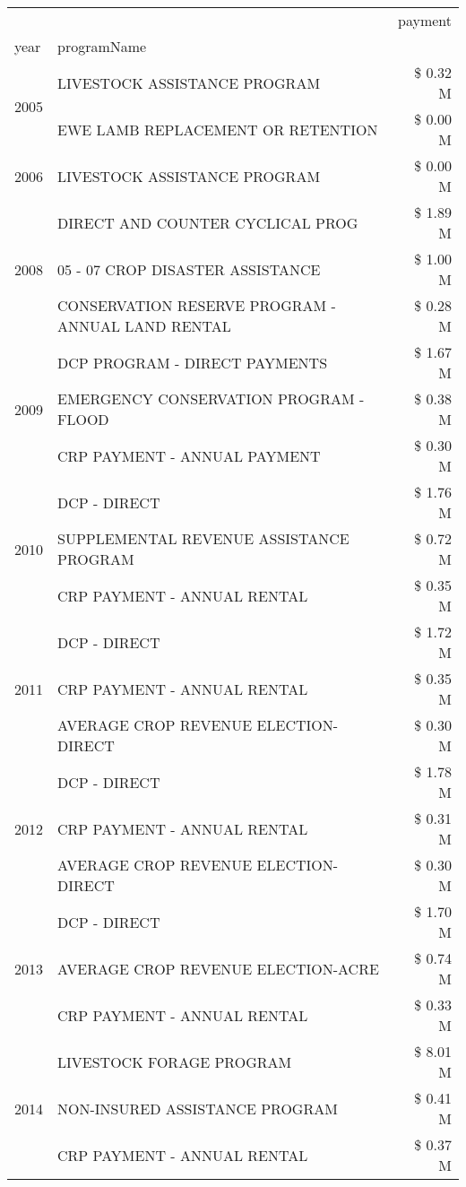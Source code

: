 \begin{tabular}{llr}
\toprule
 &  & payment \\
year & programName &  \\
\midrule
\multirow[t]{2}{*}{2005} & LIVESTOCK ASSISTANCE PROGRAM & \$ 0.32 M \\
 & EWE LAMB REPLACEMENT OR RETENTION & \$ 0.00 M \\
\cline{1-3}
2006 & LIVESTOCK ASSISTANCE PROGRAM & \$ 0.00 M \\
\cline{1-3}
\multirow[t]{3}{*}{2008} & DIRECT AND COUNTER CYCLICAL PROG & \$ 1.89 M \\
 & 05 - 07 CROP DISASTER ASSISTANCE & \$ 1.00 M \\
 & CONSERVATION RESERVE PROGRAM - ANNUAL LAND RENTAL & \$ 0.28 M \\
\cline{1-3}
\multirow[t]{3}{*}{2009} & DCP PROGRAM - DIRECT PAYMENTS & \$ 1.67 M \\
 & EMERGENCY CONSERVATION PROGRAM - FLOOD & \$ 0.38 M \\
 & CRP PAYMENT - ANNUAL PAYMENT & \$ 0.30 M \\
\cline{1-3}
\multirow[t]{3}{*}{2010} & DCP - DIRECT & \$ 1.76 M \\
 & SUPPLEMENTAL REVENUE ASSISTANCE PROGRAM & \$ 0.72 M \\
 & CRP PAYMENT - ANNUAL RENTAL & \$ 0.35 M \\
\cline{1-3}
\multirow[t]{3}{*}{2011} & DCP - DIRECT & \$ 1.72 M \\
 & CRP PAYMENT - ANNUAL RENTAL & \$ 0.35 M \\
 & AVERAGE CROP REVENUE ELECTION-DIRECT & \$ 0.30 M \\
\cline{1-3}
\multirow[t]{3}{*}{2012} & DCP - DIRECT & \$ 1.78 M \\
 & CRP PAYMENT - ANNUAL RENTAL & \$ 0.31 M \\
 & AVERAGE CROP REVENUE ELECTION-DIRECT & \$ 0.30 M \\
\cline{1-3}
\multirow[t]{3}{*}{2013} & DCP - DIRECT & \$ 1.70 M \\
 & AVERAGE CROP REVENUE ELECTION-ACRE & \$ 0.74 M \\
 & CRP PAYMENT - ANNUAL RENTAL & \$ 0.33 M \\
\cline{1-3}
\multirow[t]{3}{*}{2014} & LIVESTOCK FORAGE PROGRAM & \$ 8.01 M \\
 & NON-INSURED ASSISTANCE PROGRAM & \$ 0.41 M \\
 & CRP PAYMENT - ANNUAL RENTAL & \$ 0.37 M \\
\cline{1-3}

\end{tabular}
